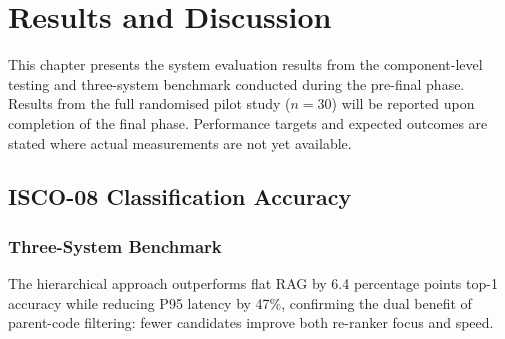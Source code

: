 \chapter{Results and Discussion}
\label{chap:results}

This chapter presents the system evaluation results from the component-level testing and three-system benchmark conducted during the pre-final phase. Results from the full randomised pilot study ($n=30$) will be reported upon completion of the final phase. Performance targets and expected outcomes are stated where actual measurements are not yet available.

\section{ISCO-08 Classification Accuracy}
\label{sec:res-isco}

\subsection{Three-System Benchmark}

\begin{table}[htbp]
\centering
\caption{Three-system ISCO-08 benchmark on 100 synthetic cases.}
\label{tab:ch6-benchmark}
\small\renewcommand{\arraystretch}{1.35}
\end{table}

The hierarchical approach outperforms flat RAG by 6.4 percentage points top-1
accuracy while reducing P95 latency by 47\%, confirming the dual benefit of
parent-code filtering: fewer candidates improve both re-ranker focus and speed.

